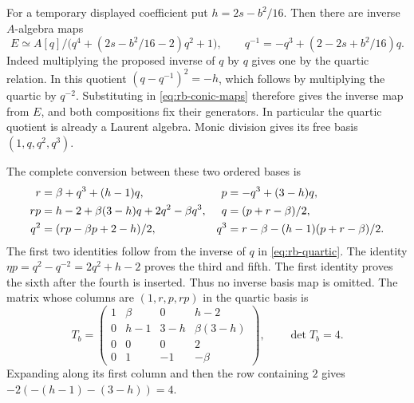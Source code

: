 For a temporary displayed coefficient put $h=2s-b^2/16$.
Then there are inverse $A$-algebra maps
\begin{equation}\label{eq:rb-quartic}
 E\simeq A[q]/\bigl(q^4+(2s-b^2/16-2)q^2+1\bigr),\qquad
 q^{-1}=-q^3+(2-2s+b^2/16)q.
\end{equation}
Indeed multiplying the proposed inverse of $q$ by $q$ gives one
by the quartic relation. In this quotient
$(q-q^{-1})^2=-h$, which follows by multiplying the quartic by
$q^{-2}$. Substituting in \eqref{eq:rb-conic-maps} therefore gives
the inverse map from $E$, and both compositions fix their generators.
In particular the quartic quotient is already a Laurent algebra.
Monic division gives its free basis $(1,q,q^2,q^3)$.

The complete conversion between these two ordered bases is
\begin{align}
 r&=\beta+q^3+(h-1)q,&
 p&=-q^3+(3-h)q,\notag\\
 rp&=h-2+\beta(3-h)q+2q^2-\beta q^3,&
 q&=(p+r-\beta)/2,\notag\\
 q^2&=(rp-\beta p+2-h)/2,&
 q^3&=r-\beta-(h-1)(p+r-\beta)/2.
 \label{eq:rb-basis-conversion}
\end{align}
The first two identities follow from the inverse of $q$ in
\eqref{eq:rb-quartic}. The identity
$\eta p=q^2-q^{-2}=2q^2+h-2$ proves the third and fifth.
The first identity proves the sixth after the fourth is inserted.
Thus no inverse basis map is omitted. The matrix whose columns are
$(1,r,p,rp)$ in the quartic basis is
\[
 T_b=\begin{pmatrix}
 1&\beta&0&h-2\\
 0&h-1&3-h&\beta(3-h)\\
 0&0&0&2\\
 0&1&-1&-\beta
 \end{pmatrix},\qquad \det T_b=4.
\]
Expanding along its first column and then the row containing $2$
gives $-2(-(h-1)-(3-h))=4$.

